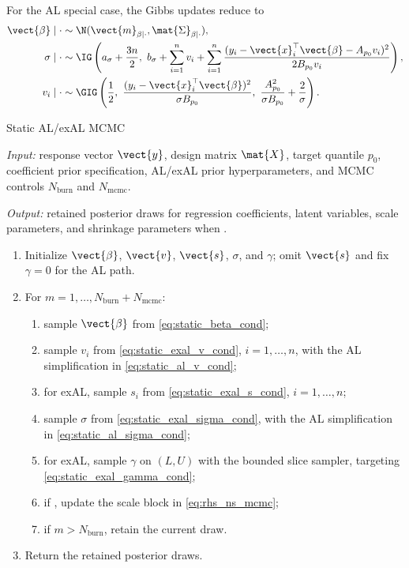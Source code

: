 For the AL special case, the Gibbs updates reduce to
\begin{align}
\vect{\beta}\mid\cdot
&\sim\N(\vect{m}_{\beta\mid\cdot},\mat{\Sigma}_{\beta\mid\cdot}),
\label{eq:static_al_beta_cond}\\
\sigma\mid\cdot
&\sim
\IG\left(
a_\sigma+\frac{3n}{2},\
b_\sigma+\sum_{i=1}^n v_i+
\sum_{i=1}^n\frac{(y_i-\vect{x}_i^\top\vect{\beta}-A_{p_0}v_i)^2}{2B_{p_0}v_i}
\right),
\label{eq:static_al_sigma_cond}\\
v_i\mid\cdot
&\sim
\GIG\left(
\frac{1}{2},\
\frac{(y_i-\vect{x}_i^\top\vect{\beta})^2}{\sigma B_{p_0}},\
\frac{A_{p_0}^2}{\sigma B_{p_0}}+\frac{2}{\sigma}
\right).
\label{eq:static_al_v_cond}
\end{align}

\begin{suppalgorithm}{Static AL/exAL MCMC}
\label{alg:static-mcmc}
\par\noindent\emph{Input:} response vector $\vect{y}$, design matrix
$\mat{X}$, target quantile $p_0$, coefficient prior specification, AL/exAL
prior hyperparameters, and MCMC controls $N_{\mathrm{burn}}$ and
$N_{\mathrm{mcmc}}$.
\par\noindent\emph{Output:} retained posterior draws for regression
coefficients, latent variables, scale parameters, and shrinkage parameters when
.
\begin{enumerate}[label=(\arabic*)]
\item Initialize $\vect{\beta}$, $\vect{v}$, $\vect{s}$, $\sigma$, and
$\gamma$; omit $\vect{s}$ and fix $\gamma=0$ for the AL path.
\item For $m=1,\ldots,N_{\mathrm{burn}}+N_{\mathrm{mcmc}}$:
  \begin{enumerate}[label=(\alph*)]
  \item sample $\vect{\beta}$ from \eqref{eq:static_beta_cond};
  \item sample $v_i$ from \eqref{eq:static_exal_v_cond},
  $i=1,\ldots,n$, with the AL simplification in \eqref{eq:static_al_v_cond};
  \item for exAL, sample $s_i$ from \eqref{eq:static_exal_s_cond},
  $i=1,\ldots,n$;
  \item sample $\sigma$ from \eqref{eq:static_exal_sigma_cond}, with the AL
  simplification in \eqref{eq:static_al_sigma_cond};
  \item for exAL, sample $\gamma$ on $(L,U)$ with the bounded slice sampler,
  targeting \eqref{eq:static_exal_gamma_cond};
  \item if \code{beta_prior = "rhs\_ns"}, update the  scale block in
  \eqref{eq:rhs_ns_mcmc};
  \item if $m>N_{\mathrm{burn}}$, retain the current draw.
  \end{enumerate}
\item Return the retained posterior draws.
\end{enumerate}
\end{suppalgorithm}

